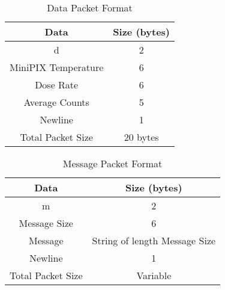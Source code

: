 \begin{table}[!ht]
\centering
\caption{Data Packet Format} 
\label{tab:DataPacket}
\bigskip
\begin{tabular}{|c|c|}
\hline
\multicolumn{1}{|c|}{\bfseries Data} & \multicolumn{1}{c|}{\bfseries Size (bytes)}\\
\hline
    d						& 2		\\ \hline 
    MiniPIX Temperature 			& 6		\\ \hline
    Dose Rate					& 6		\\ \hline %
    Average Counts   				& 5		\\ \hline
    Newline					& 1		\\ \hline
    Total Packet Size				& 20 bytes		\\ \hline
    
\end{tabular}
\medskip
\end{table}

\begin{table}[!ht]
\centering
\caption{Message Packet Format} 
\label{tab:DataPacket}
\bigskip
\begin{tabular}{|c|c|}
\hline
\multicolumn{1}{|c|}{\bfseries Data} & \multicolumn{1}{c|}{\bfseries Size (bytes)}\\
\hline
    m						& 2		\\ \hline 
    Message Size 				& 6		\\ \hline
    Message					& String of length Message Size		\\ \hline %
    Newline					& 1		\\ \hline
    Total Packet Size				& Variable		\\ \hline
    
\end{tabular}
\medskip
\end{table}


